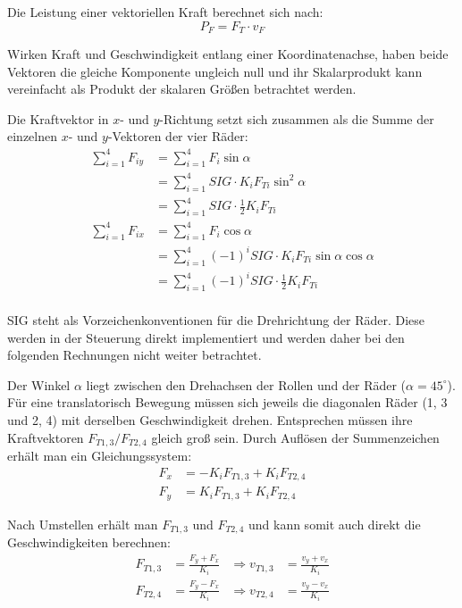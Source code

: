 \documentclass[a4paper]{article}
\begin{document}
Die Leistung einer vektoriellen Kraft berechnet sich nach:
$$ P_F = F_T \cdot v_F $$

Wirken Kraft und Geschwindigkeit entlang einer Koordinatenachse, haben beide Vektoren die gleiche Komponente ungleich null und ihr Skalarprodukt kann vereinfacht als Produkt der skalaren Größen betrachtet werden.

Die Kraftvektor in $x$- und $y$-Richtung setzt sich zusammen als die Summe der einzelnen $x$- und $y$-Vektoren der vier Räder:
\begin{align*}
    \sum_{i=1}^4 F_{iy} &= \sum_{i=1}^4 F_i \sin \alpha                 \\
    &= \sum_{i=1}^4 SIG \cdot K_i F_{Ti} \sin^2 \alpha                  \\
    &= \sum_{i=1}^4 SIG \cdot \frac{1}{2} K_i F_{Ti}                    \\
    \sum_{i=1}^4 F_{ix} &= \sum_{i=1}^4 F_i \cos \alpha                 \\
    &= \sum_{i=1}^4 (-1)^i SIG \cdot K_i F_{Ti} \sin \alpha \cos \alpha \\
    &= \sum_{i=1}^4 (-1)^i SIG \cdot \frac{1}{2} K_i F_{Ti}             \\
\end{align*}

SIG steht als Vorzeichenkonventionen für die Drehrichtung der Räder. Diese werden in der Steuerung direkt implementiert und werden daher bei den folgenden Rechnungen nicht weiter betrachtet.

Der Winkel $ \alpha $ liegt zwischen den Drehachsen der Rollen und der Räder ($\alpha = 45^\circ$).
Für eine translatorisch Bewegung müssen sich jeweils die diagonalen Räder (1, 3 und 2, 4) mit derselben Geschwindigkeit drehen. Entsprechen müssen ihre Kraftvektoren $F_{T1, 3} / F_{T2, 4}$ gleich groß sein.
Durch Auflösen der Summenzeichen erhält man ein Gleichungssystem:
\begin{align*}
    F_x &= - K_i F_{T1, 3} + K_i F_{T2, 4} \\
    F_y &= K_i F_{T1, 3}   + K_i F_{T2, 4}
\end{align*}

Nach Umstellen erhält man $F_{T1, 3}$ und $F_{T2, 4}$ und kann somit auch direkt die Geschwindigkeiten berechnen:
\begin{align*}
    F_{T1, 3} &= \frac{F_y + F_x}{K_i} &\Rightarrow v_{T1, 3} &= \frac{v_y + v_x}{K_i} \\
    F_{T2, 4} &= \frac{F_y - F_x}{K_i} &\Rightarrow v_{T2, 4} &= \frac{v_y - v_x}{K_i} \\
\end{align*}
\end{document}
